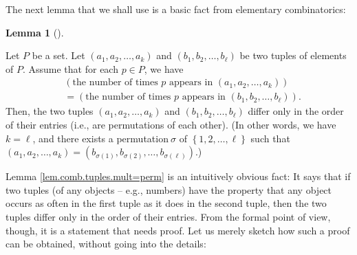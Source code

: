 \documentclass[numbers=enddot,12pt,final,onecolumn,notitlepage]{scrartcl}%
\numberwithin{exer}{subsection}
\theoremstyle{definition}
\newtheorem{lem}[theo]{Lemma}
\newenvironment{lemma}[1][]
{\begin{lem}[#1]\begin{leftbar}}
{\end{leftbar}\end{lem}}
\begin{document}
The next lemma that we shall use is a basic fact from elementary combinatorics:

\begin{lemma}
\label{lem.comb.tuples.mult=perm}Let $P$ be a set. Let $\left(  a_{1}%
,a_{2},\ldots,a_{k}\right)  $ and $\left(  b_{1},b_{2},\ldots,b_{\ell}\right)
$ be two tuples of elements of $P$. Assume that for each $p\in P$, we have%
\begin{align}
&  \left(  \text{the number of times }p\text{ appears in }\left(  a_{1}%
,a_{2},\ldots,a_{k}\right)  \right) \nonumber\\
&  =\left(  \text{the number of times }p\text{ appears in }\left(  b_{1}%
,b_{2},\ldots,b_{\ell}\right)  \right)  .
\label{eq.lem.comb.tuples.mult=perm.ass}%
\end{align}
Then, the two tuples $\left(  a_{1},a_{2},\ldots,a_{k}\right)  $ and $\left(
b_{1},b_{2},\ldots,b_{\ell}\right)  $ differ only in the order of their
entries (i.e., are permutations of each other). (In other words, we have
$k=\ell$, and there exists a permutation\footnotemark$\ \sigma$ of $\left\{
1,2,\ldots,\ell\right\}  $ such that $\left(  a_{1},a_{2},\ldots,a_{k}\right)
=\left(  b_{\sigma\left(  1\right)  },b_{\sigma\left(  2\right)  }%
,\ldots,b_{\sigma\left(  \ell\right)  }\right)  $.)
\end{lemma}

 Lemma \ref{lem.comb.tuples.mult=perm} is an intuitively
obvious fact: It says that if two tuples (of any objects -- e.g., numbers)
have the property that any object occurs as often in the first tuple as it
does in the second tuple, then the two tuples differ only in the order of
their entries. From the formal point of view, though, it is a statement that
needs proof. Let us merely sketch how such a proof can be obtained, without
going into the details:
\end{document}
